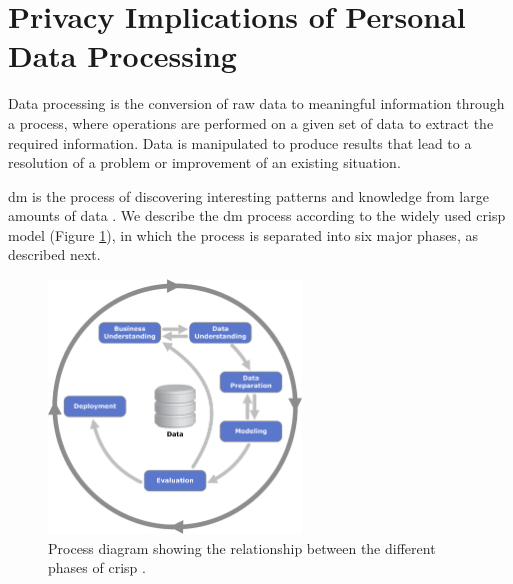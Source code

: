 
\section{Privacy Implications of Personal Data Processing} 
\label{sec:PrivacyImplicationsPersonalDataProcessing}


Data processing is the conversion of raw data to meaningful information through a process, where operations are performed on a given set of data to extract the required information. Data is manipulated to produce results that lead to a resolution of a problem or improvement of an existing situation. 

\ac{dm} is the process of discovering interesting patterns and knowledge from large amounts of data \cite{han2011data}. We describe the \ac{dm} process according to the widely used \ac{crisp} model \cite{wirth2000crisp} (Figure \ref{fig:crisp-dm}), in which the process is separated into six major phases, as described next.

\begin{figure}[!h]
  \centering
  \includegraphics[width=0.60\textwidth]{images/CRISP-DM_Process_Diagram.png}
  \caption{Process diagram showing the relationship between the different phases of \acs{crisp} \cite{wirth2000crisp}.}
  \label{fig:crisp-dm}
\end{figure}

